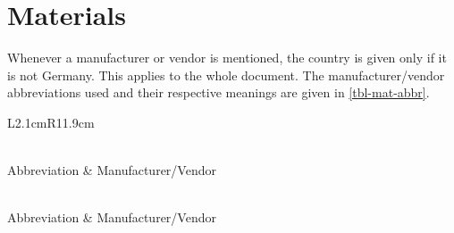 \section{Materials}
Whenever a manufacturer or vendor is mentioned, the country is given only if it is not Germany. This applies to the whole document. The manufacturer/vendor abbreviations used and their respective meanings are given in \vref{tbl-mat-abbr}.
{
\setlength{\tabcolsep}{5pt}
\begin{longtable}{L{2.1cm}R{11.9cm}}
	\caption[Manufacturer/Vendor Abbreviations Used Throughout the Document]{Manufacturer/vendor abbreviations used throughout the document. \label{tbl-mat-abbr}}\\
	\toprule
	{Abbreviation} & {Manufacturer/Vendor} \\
	\hline \endfirsthead
	\caption[]{\textit{continued from the previous page}} \\
	\toprule
	{Abbreviation} & {Manufacturer/Vendor} \\
	\hline \endhead
	\hline
	 \\
	\endfoot
	\bottomrule
	\endlastfoot
\end{longtable}
}

